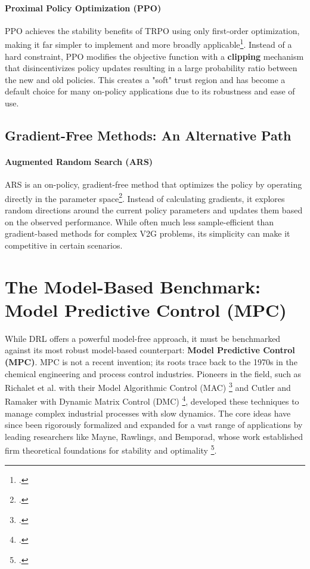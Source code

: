 \paragraph{Proximal Policy Optimization (PPO)}
PPO achieves the stability benefits of TRPO using only first-order optimization, making it far simpler to implement and more broadly applicable\footcite{schulman2017proximal}. Instead of a hard constraint, PPO modifies the objective function with a \textbf{clipping} mechanism that disincentivizes policy updates resulting in a large probability ratio between the new and old policies. This creates a "soft" trust region and has become a default choice for many on-policy applications due to its robustness and ease of use.

\subsection{Gradient-Free Methods: An Alternative Path}
\paragraph{Augmented Random Search (ARS)}
ARS is an on-policy, gradient-free method that optimizes the policy by operating directly in the parameter space\footcite{mania2018simple}. Instead of calculating gradients, it explores random directions around the current policy parameters and updates them based on the observed performance. While often much less sample-efficient than gradient-based methods for complex V2G problems, its simplicity can make it competitive in certain scenarios.

\section{The Model-Based Benchmark: Model Predictive Control (MPC)}
While DRL offers a powerful model-free approach, it must be benchmarked against its most robust model-based counterpart: \textbf{Model Predictive Control (MPC)}. MPC is not a recent invention; its roots trace back to the 1970s in the chemical engineering and process control industries. Pioneers in the field, such as Richalet et al. with their Model Algorithmic Control (MAC) \footcite{Richalet1978ModelPH} and Cutler and Ramaker with Dynamic Matrix Control (DMC) \footcite{Cutler1980}, developed these techniques to manage complex industrial processes with slow dynamics. The core ideas have since been rigorously formalized and expanded for a vast range of applications by leading researchers like Mayne, Rawlings, and Bemporad, whose work established firm theoretical foundations for stability and optimality \footcite{mayne2000constrained}.

